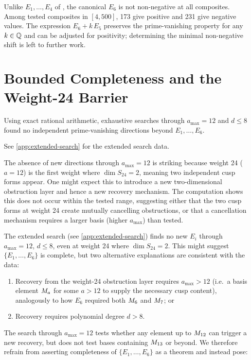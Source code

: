 \documentclass[11pt]{article}
\begin{document}
Unlike $E_1,\dots,E_4$ of \cite{CIO2024}, the canonical $E_6$ is not non-negative at all
composites.
Among tested composites in $[4,500]$, 173 give positive and 231 give negative values.
The expression $E_6 + k\,E_5$ preserves the prime-vanishing property for any $k\in\mathbb{Q}$
and can be adjusted for positivity; determining the minimal non-negative shift is left
to further work.

\section{Bounded Completeness and the Weight-24 Barrier}
\label{sec:completeness}

\begin{proposition}
\label{prop:bounded-complete}
Using exact rational arithmetic, exhaustive searches through $a_{\max}=12$ and $d\le 8$
found no independent prime-vanishing directions beyond $E_1,\dots,E_6$.
\end{proposition}

See \cref{app:extended-search} for the extended search data.

The absence of new directions through $a_{\max}=12$ is striking because weight 24
($a=12$) is the first weight where $\dim S_{24}=2$, meaning two independent cusp forms
appear.
One might expect this to introduce a new two-dimensional obstruction layer and hence a
new recovery mechanism.
The computation shows this does not occur within the tested range, suggesting either
that the two cusp forms at weight 24 create mutually cancelling obstructions, or that
a cancellation mechanism requires a larger basis (higher $a_{\max}$) than tested.

\begin{remark}
\label{rem:weight24}
The extended search (see \cref{app:extended-search}) finds no new $E_i$ through
$a_{\max}=12$, $d\le 8$, even at weight 24 where $\dim S_{24}=2$.
This might suggest $\{E_1,\dots,E_6\}$ is complete, but two alternative explanations
are consistent with the data:
\begin{enumerate}[label=(\roman*)]
  \item Recovery from the weight-24 obstruction layer requires $a_{\max}>12$ (i.e.\ a
        basis element $M_{a}$ for some $a>12$ to supply the necessary cusp content),
        analogously to how $E_6$ required both $M_{6}$ and $M_{7}$; or
  \item Recovery requires polynomial degree $d>8$.
\end{enumerate}
The search through $a_{\max}=12$ tests whether any element up to $M_{12}$ can trigger a
new recovery, but does not test bases containing $M_{13}$ or beyond.
We therefore refrain from asserting completeness of $\{E_1,\dots,E_6\}$ as a theorem
and instead pose:
\end{remark}
\end{document}
